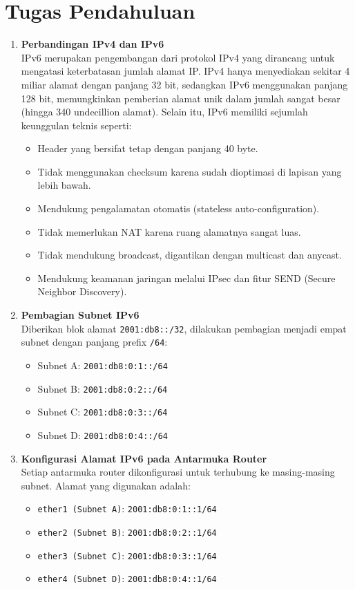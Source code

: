 \section{Tugas Pendahuluan}
\begin{enumerate}
 \item \textbf{Perbandingan IPv4 dan IPv6}\\
    IPv6 merupakan pengembangan dari protokol IPv4 yang dirancang untuk mengatasi keterbatasan jumlah alamat IP. IPv4 hanya menyediakan sekitar 4 miliar alamat dengan panjang 32 bit, sedangkan IPv6 menggunakan panjang 128 bit, memungkinkan pemberian alamat unik dalam jumlah sangat besar (hingga 340 undecillion alamat). Selain itu, IPv6 memiliki sejumlah keunggulan teknis seperti:
    \begin{itemize}
        \item Header yang bersifat tetap dengan panjang 40 byte.
        \item Tidak menggunakan checksum karena sudah dioptimasi di lapisan yang lebih bawah.
        \item Mendukung pengalamatan otomatis (stateless auto-configuration).
        \item Tidak memerlukan NAT karena ruang alamatnya sangat luas.
        \item Tidak mendukung broadcast, digantikan dengan multicast dan anycast.
        \item Mendukung keamanan jaringan melalui IPsec dan fitur SEND (Secure Neighbor Discovery).
    \end{itemize}

    \item \textbf{Pembagian Subnet IPv6}\\
    Diberikan blok alamat \texttt{2001:db8::/32}, dilakukan pembagian menjadi empat subnet dengan panjang prefix \texttt{/64}:
    \begin{itemize}
        \item Subnet A: \texttt{2001:db8:0:1::/64}
        \item Subnet B: \texttt{2001:db8:0:2::/64}
        \item Subnet C: \texttt{2001:db8:0:3::/64}
        \item Subnet D: \texttt{2001:db8:0:4::/64}
    \end{itemize}

    \item \textbf{Konfigurasi Alamat IPv6 pada Antarmuka Router}\\
    Setiap antarmuka router dikonfigurasi untuk terhubung ke masing-masing subnet. Alamat yang digunakan adalah:
    \begin{itemize}
        \item \texttt{ether1 (Subnet A)}: \texttt{2001:db8:0:1::1/64}
        \item \texttt{ether2 (Subnet B)}: \texttt{2001:db8:0:2::1/64}
        \item \texttt{ether3 (Subnet C)}: \texttt{2001:db8:0:3::1/64}
        \item \texttt{ether4 (Subnet D)}: \texttt{2001:db8:0:4::1/64}
    \end{itemize}


\end{enumerate}
